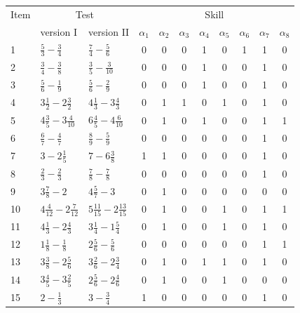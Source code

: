 \documentclass[english]{pwr_wmat_praca_dyplomowa}
\theoremstyle{plain}
\numberwithin{theorem}{chapter}
\theoremstyle{definition}
\numberwithin{theorem}{chapter}
\begin{document}
	\begin{table}[ht]
		\centering
		\begin{tabular}{l l l c c c c c c c c} 
			\hline
			{\rule{0pt}{3ex}}Item & \multicolumn{2}{c}{Test} & \multicolumn{8}{c}{Skill} \\
			& version I & version II &  $\alpha_1$ & $\alpha_2$ & $\alpha_3$ &  $\alpha_4$ & $\alpha_5$ & $\alpha_6$ & $\alpha_7$ & $\alpha_8$ \\ [0.5ex] 
			\hline
			{\rule{0pt}{3ex}}1 & $\frac{5}{3} - \frac{3}{4}$ & $\frac{7}{4} - \frac{5}{6}$ & 0 & 0 & 0 & 1 & 0 & 1 & 1 & 0 \\ [1ex]
			2 & $\frac{3}{4} - \frac{3}{8}$ & $\frac{3}{5} - \frac{3}{10}$ & 0 & 0 & 0 & 1 & 0 & 0 & 1 & 0 \\ [1ex]
			3 & $\frac{5}{6} - \frac{1}{9}$ & $\frac{5}{6} - \frac{2}{9}$ & 0 & 0 & 0 & 1 & 0 & 0 & 1 & 0 \\ [1ex]
			4 & $3\frac{1}{2} - 2\frac{3}{2}$ & $4\frac{1}{3} - 3\frac{4}{3}$ & 0 & 1 & 1 & 0 & 1 & 0 & 1 & 0 \\ [1ex]
			5 & $4\frac{3}{5} - 3\frac{4}{10}$ & $6\frac{4}{5} - 4\frac{6}{10}$ & 0 & 1 & 0 & 1 & 0 & 0 & 1 & 1 \\ [1ex]
			6 & $\frac{6}{7} - \frac{4}{7}$ & $\frac{8}{9} - \frac{5}{9}$ & 0 & 0 & 0 & 0 & 0 & 0 & 1 & 0 \\ [1ex]
			7 & $3 - 2\frac{1}{5}$ & $7 - 6\frac{3}{8}$ & 1 & 1 & 0 & 0 & 0 & 0 & 1 & 0 \\ [1ex]
			8 & $\frac{2}{3} - \frac{2}{3}$ & $\frac{7}{8} - \frac{7}{8}$ & 0 & 0 & 0 & 0 & 0 & 0 & 1 & 0 \\ [1ex]
			9 & $3\frac{7}{8} - 2$ & $4\frac{5}{7} - 3$ & 0 & 1 & 0 & 0 & 0 & 0 & 0 & 0 \\ [1ex]
			10 & $4\frac{4}{12} - 2\frac{7}{12}$ & $5\frac{11}{15} - 2\frac{13}{15}$ & 0 & 1 & 0 & 0 & 1 & 0 & 1 & 1 \\ [1ex]
			11 & $4\frac{1}{3} - 2\frac{4}{3}$ & $3\frac{1}{4} - 1\frac{5}{4}$ & 0 & 1 & 0 & 0 & 1 & 0 & 1 & 0 \\ [1ex]
			12 & $1\frac{1}{8} - \frac{1}{8}$ & $2\frac{5}{6} - \frac{5}{6}$ & 0 & 0 & 0 & 0 & 0 & 0 & 1 & 1 \\ [1ex]
			13 & $3\frac{3}{8} - 2\frac{5}{6}$ & $3\frac{2}{6} - 2\frac{3}{4}$ & 0 & 1 & 0 & 1 & 1 & 0 & 1 & 0 \\ [1ex]
			14 & $3\frac{4}{5} - 3\frac{2}{5}$ & $2\frac{5}{6} - 2\frac{4}{6}$ & 0 & 1 & 0 & 0 & 1 & 0 & 0 & 0 \\ [1ex]
			15 & $2 - \frac{1}{3}$ & $3 - \frac{3}{4}$ & 1 & 0 & 0 & 0 & 0 & 0 & 1 & 0 \\ [1ex]

\end{tabular}
\end{table}
\end{document}
